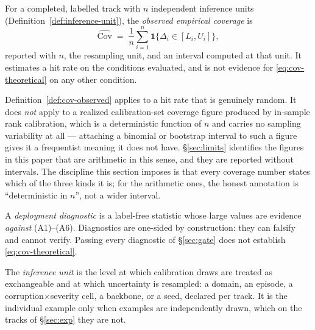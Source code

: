\begin{definition}\label{def:cov-observed}
For a completed, labelled track with $n$ independent inference units
(Definition~\ref{def:inference-unit}), the \emph{observed empirical coverage} is
\begin{equation}\label{eq:cov-observed}
  \widehat{\mathrm{Cov}}
  \;=\;
  \frac{1}{n}\sum_{i=1}^{n}\mathbf{1}\bigl\{\Delta_i \in [L_i,U_i]\bigr\},
\end{equation}
reported with $n$, the resampling unit, and an interval computed at that unit. It
estimates a hit rate on the conditions evaluated, and is not evidence for
\eqref{eq:cov-theoretical} on any other condition.
\end{definition}

\begin{remark}\label{rem:no-interval}
Definition~\ref{def:cov-observed} applies to a hit rate that is genuinely random. It does
\emph{not} apply to a realized calibration-set coverage figure produced by in-sample rank
calibration, which is a deterministic function of $n$ and carries no sampling variability
at all --- attaching a binomial or bootstrap interval to such a figure gives it a
frequentist meaning it does not have. \S\ref{sec:limits} identifies the figures in this
paper that are arithmetic in this sense, and they are reported without intervals. The
discipline this section imposes is that every coverage number states which of the three
kinds it is; for the arithmetic ones, the honest annotation is ``deterministic in $n$'',
not a wider interval.
\end{remark}

\begin{definition}\label{def:cov-diagnostic}
A \emph{deployment diagnostic} is a label-free statistic whose large values are evidence
\emph{against} (A1)--(A6). Diagnostics are one-sided by construction: they can falsify
and cannot verify. Passing every diagnostic of \S\ref{sec:gate} does not establish
\eqref{eq:cov-theoretical}.
\end{definition}

\begin{definition}\label{def:inference-unit}
The \emph{inference unit} is the level at which calibration draws are treated as
exchangeable and at which uncertainty is resampled: a domain, an episode, a
corruption$\times$severity cell, a backbone, or a seed, declared per track. It is the
individual example only when examples are independently drawn, which on the tracks of
\S\ref{sec:exp} they are not.
\end{definition}


